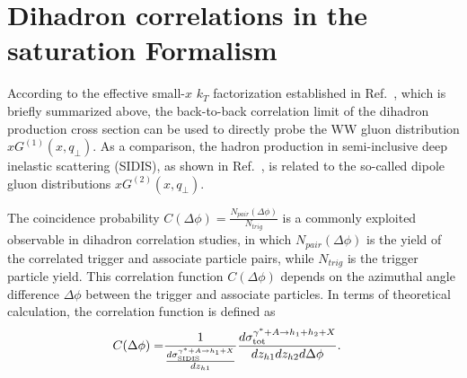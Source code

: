 \section{Dihadron correlations in the saturation Formalism}\label{sec:dihadrontheory}

According to the effective small-$x$ $k_T$ factorization established in
Ref.~\cite{Dominguez:2011wm}, which is briefly summarized above, the
back-to-back correlation limit of the dihadron production cross section can be used
to directly probe the WW gluon distribution $xG^{(1)}(x,q_{\perp})$. As a
comparison, the hadron production in semi-inclusive deep inelastic scattering
(SIDIS), as shown in Ref.~\cite{Marquet:2009ca}, is related to the so-called
dipole gluon distributions $xG^{(2)}(x,q_{\perp})$.

The coincidence probability $C(\Delta\phi)=\frac{N_{pair}(\Delta\phi)}{N_{trig}}$ is a
commonly exploited observable in dihadron correlation studies, in which
$N_{pair}(\Delta\phi)$ is the yield of the correlated trigger and associate
particle pairs, while $N_{trig}$ is the trigger particle yield. This
correlation function $C(\Delta\phi)$ depends on the azimuthal angle difference $\Delta\phi$
between the trigger and associate particles. In terms of theoretical
calculation, the correlation function is defined as
\begin{eqnarray} 
C(\Delta\phi) 
= & \frac{1}{\frac{d\sigma^{\gamma^{*}+A\rightarrow h_{1}+X}_{\textrm{SIDIS}}}{dz_{h1}}}
\frac{d\sigma^{\gamma^{*}+A\rightarrow h_{1}+h_{2}+X}_{\textrm{tot}}}{dz_{h1}dz_{h2}d\Delta\phi}.
\label{eqn:cdphiCGC} 
\end{eqnarray}

